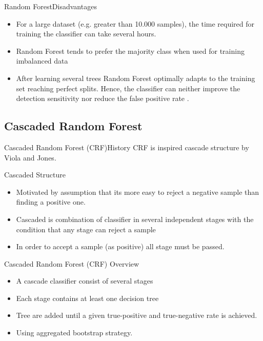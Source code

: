 \documentclass{beamer}
\begin{document}
\begin{frame}{Random Forest}{Disadvantages}
	\begin{itemize}
		\item For a large dataset (e.g. greater than 10.000 samples), the time
		required for training the classifier can take several hours.
		\item Random Forest tends to prefer the majority class when used for
		training imbalanced data \cite{strobl2007bias}
		\item After learning several trees Random Forest optimally adapts to
		the training set reaching perfect splits. Hence, the classifier can
		neither improve the detection sensitivity nor reduce the false positive
		rate \cite{baumann2013cascaded}.
	\end{itemize}
\end{frame}

\subsection{Cascaded Random Forest}

\begin{frame}{Cascaded Random Forest (CRF)}{History}
	CRF is inspired cascade structure by Viola and Jones.

	\begin{block}{Cascaded Structure}
		\begin{itemize}
		\item Motivated by assumption that its more easy to reject a negative
		sample than finding a positive one.
		\item Cascaded is combination of classifier in several independent
		stages with the condition that any stage can reject a sample
		\item In order to accept a sample (as positive) all stage must be
		passed.
		\end{itemize}
	\end{block}
\end{frame}

\begin{frame}
	{Cascaded Random Forest (CRF)}
	{Overview}
	\begin{itemize}
		\item A cascade classifier consist of several stages
		\item Each stage contains at least one decision tree
		\item Tree are added until a given true-positive and true-negative rate
		is achieved.
		\item Using aggregated bootstrap strategy.
	\end{itemize}
\end{frame}
\end{document}
